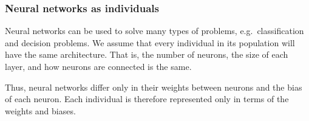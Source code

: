 \subsubsection{Neural networks as individuals}

Neural networks can be used to solve many types of problems, e.g.\ classification and decision problems. We assume that every individual in its population will have the same architecture. That is, the number of neurons, the size of each layer, and how neurons are connected is the same.


Thus, neural networks differ only in their weights between neurons and the bias of each neuron. Each individual is therefore represented only in terms of the weights and biases.



%
